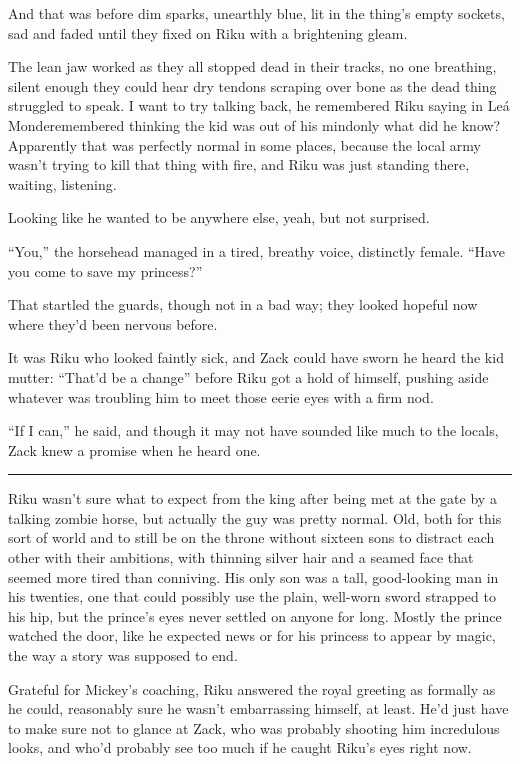 And that was before dim sparks, unearthly blue, lit in the thing's empty sockets, sad and faded until they fixed on Riku with a brightening gleam.

The lean jaw worked as they all stopped dead in their tracks, no one breathing, silent enough they could hear dry tendons scraping over bone as the dead thing struggled to speak. I want to try talking back, he remembered Riku saying in Leá Monde\textemdash remembered thinking the kid was out of his mind\textemdash only what did he know? Apparently that was perfectly normal in some places, because the local army wasn't trying to kill that thing with fire, and Riku was just standing there, waiting, listening.

Looking like he wanted to be anywhere else, yeah, but not surprised.

``You,'' the horsehead managed in a tired, breathy voice, distinctly female. ``Have you come to save my princess?''

That startled the guards, though not in a bad way; they looked hopeful now where they'd been nervous before.

It was Riku who looked faintly sick, and Zack could have sworn he heard the kid mutter: ``That'd be a change'' before Riku got a hold of himself, pushing aside whatever was troubling him to meet those eerie eyes with a firm nod.

``If I can,'' he said, and though it may not have sounded like much to the locals, Zack knew a promise when he heard one.

\fancybreak{\pfbreakdisplay}


Riku wasn't sure what to expect from the king after being met at the gate by a talking zombie horse, but actually the guy was pretty normal. Old, both for this sort of world and to still be on the throne without sixteen sons to distract each other with their ambitions, with thinning silver hair and a seamed face that seemed more tired than conniving. His only son was a tall, good-looking man in his twenties, one that could possibly use the plain, well-worn sword strapped to his hip, but the prince's eyes never settled on anyone for long. Mostly the prince watched the door, like he expected news or for his princess to appear by magic, the way a story was supposed to end.

Grateful for Mickey's coaching, Riku answered the royal greeting as formally as he could, reasonably sure he wasn't embarrassing himself, at least. He'd just have to make sure not to glance at Zack, who was probably shooting him incredulous looks, and who'd probably see too much if he caught Riku's eyes right now.

